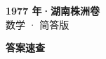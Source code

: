 \documentclass[zihao=-4, a4paper]{ctexart}
\begin{document}
\begin{center}
  {\Large\bfseries 1977 年·湖南株洲卷}\\[4pt]
  {\large 数学 · 简答版}
\end{center}
\medskip
{}

\clearpage
{}
\begin{center}{\Large\bfseries 答案速查}\end{center}
\medskip

\end{document}
